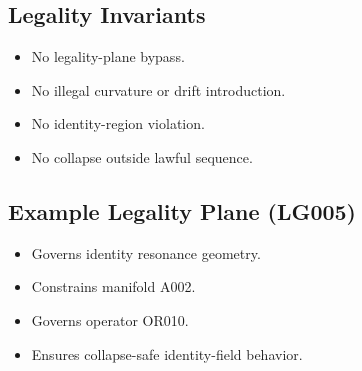 \subsection{Legality Invariants}
\begin{itemize}
    \item No legality-plane bypass.
    \item No illegal curvature or drift introduction.
    \item No identity-region violation.
    \item No collapse outside lawful sequence.
\end{itemize}

\subsection{Example Legality Plane (LG005)}
\begin{itemize}
    \item Governs identity resonance geometry.
    \item Constrains manifold A002.
    \item Governs operator OR010.
    \item Ensures collapse-safe identity-field behavior.
\end{itemize}
